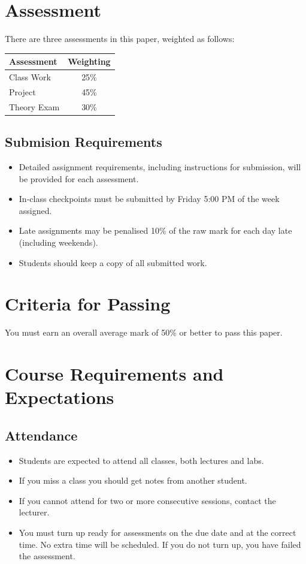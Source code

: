 \documentclass{article}
\begin{document}
\newpage 

\section*{Assessment}
There are three assessments in this paper, weighted as follows:


\begin{tabular}{|l|c|}
\hline
Assessment &  Weighting \\ \hline
 Class Work & 25\% \\ \hline
 Project & 45\% \\ \hline
 Theory Exam & 30\% \\ \hline
\end{tabular}
\subsection*{Submision Requirements}
\begin{itemize}
	\item Detailed assignment requirements, including instructions for submission, will be provided for each assessment.
        \item In-class checkpoints must be submitted by Friday 5:00 PM of the week assigned.
	\item Late assignments may be penalised 10\% of the raw mark for each day late (including weekends).
	\item Students should keep a copy of all submitted work.
\end{itemize}

\section*{Criteria for Passing}
You must earn an overall average mark of 50\% or better to pass this paper.

\section*{Course Requirements and Expectations}
\subsection*{Attendance}
\begin{itemize}
 \item Students are expected to attend all classes, both lectures and labs.
 \item If you miss a class you should get notes from another student.
 \item If you cannot attend for two or more consecutive sessions, contact the lecturer.
 \item You must turn up ready for assessments on the due date and at the correct time. No extra time will be scheduled. If you do not turn up, you have failed the assessment.
\end{itemize}
\end{document}
